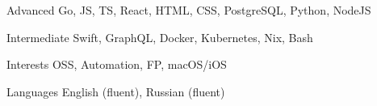 
\begin{cvskills}

  \cvskill
    {Advanced}
    {Go, JS, TS, React, HTML, CSS, PostgreSQL, Python, NodeJS}

    \cvskill
    {Intermediate}
    {Swift, GraphQL, Docker, Kubernetes, Nix, Bash}

   \cvskill
    {Interests}
    {OSS, Automation, FP, macOS/iOS}

  \cvskill
    {Languages}
    {English (fluent), Russian (fluent)}

\end{cvskills}
